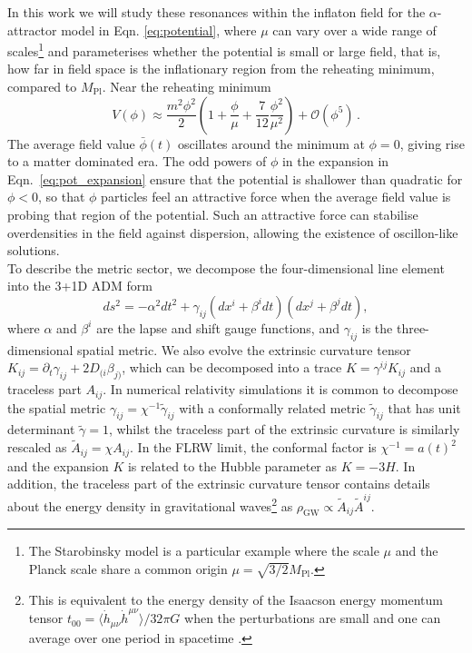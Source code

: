 \documentclass[
    reprint,
    preprintnumbers,
    superscriptaddress,
    nofootinbib,
     amsmath,amssymb,
     aps,
     prd,
    floatfix,
    ]{revtex4-2}
\newcommand{\mpl}{M_\mathrm{Pl}}
\begin{document}
In this work we will study these resonances within the inflaton field for the $\alpha$-attractor model in Eqn. \eqref{eq:potential}, where $\mu$ can vary over a wide range of scales\footnote{The Starobinsky model is a particular example where the scale $\mu$ and the Planck scale share a common origin $\mu = \sqrt{3/2}\mpl$.} and parameterises whether the potential is small or large field, that is, how far in field space is the inflationary region from the reheating minimum, compared to $\mpl$. Near the reheating minimum
\begin{equation}\label{eq:pot_expansion}
    V(\phi)\approx \frac{m^2\phi^2}{2}\left(1 + \frac{\phi}{\mu} + \frac{7}{12}\frac{\phi^2}{\mu^2}\right) + \mathcal{O}(\phi^5) \,.
\end{equation}
The average field value $\bar\phi(t)$ oscillates around the minimum at $\phi = 0$, giving rise to a matter dominated era. The odd powers of $\phi$ in the expansion in Eqn.~\eqref{eq:pot_expansion} ensure that the potential is shallower than quadratic for $\phi < 0$, so that $\phi$ particles feel an attractive force when the average field value is probing that region of the potential. Such an attractive force can stabilise overdensities in the field against dispersion, allowing the existence of oscillon-like solutions.\\



To describe the metric sector, we decompose the four-dimensional line element into the 3+1D ADM form
\begin{equation}
    ds^2 = -\alpha^2dt^2 + \gamma_{ij}(dx^i + \beta^i dt)(dx^j + \beta^j dt),
\end{equation}
where $\alpha$ and $\beta^i$ are the lapse and shift gauge functions, and $\gamma_{ij}$ is the three-dimensional spatial metric. We also evolve the extrinsic curvature tensor $K_{ij}=\partial_{t} \gamma_{ij} + 2 D_{(i} \beta_{j)}$, which can be decomposed into a trace $K=\gamma^{ij}K_{ij}$  and a traceless part $A_{ij}$. In numerical relativity simulations it is common to decompose the spatial metric $\gamma_{ij}=\chi^{-1}\tilde{\gamma}_{ij}$ with a conformally related metric $\tilde{\gamma}_{ij}$ that has unit determinant $\tilde{\gamma} = 1$, whilst the traceless part of the extrinsic curvature is similarly rescaled as $\tilde{A}_{ij} = \chi A_{ij}$.  In the FLRW limit, the conformal factor is $\chi^{-1}=a(t)^2$ and the expansion $K$ is related to the Hubble parameter as $K=-3H$. In addition, the traceless part of the extrinsic curvature tensor contains details about the energy density in gravitational waves\footnote{This is equivalent to the energy density of the Isaacson energy momentum tensor $t_{00} = \langle\dot{h}_{\mu\nu} \dot{h}^{\mu\nu}\rangle /32\pi G$ when the perturbations are small and one can average over one period in spacetime \cite{Isaacson:1968hbi}.} as $\rho_\mathrm{GW}\propto \tilde{A}_{ij}\tilde{A}^{ij}$.
\end{document}
